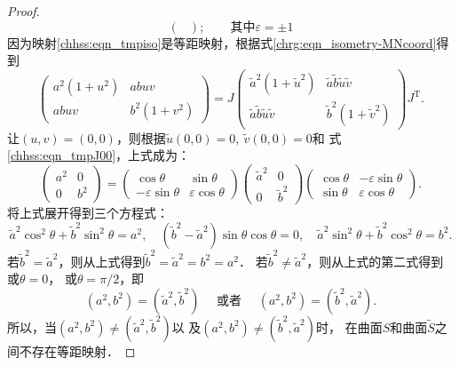 \begin{proof}
\begin{equation}
\begin{pmatrix}
    \end{pmatrix}; 
    \qquad \text{其中} \varepsilon= \pm 1
\end{equation}
因为映射\eqref{chhss:eqn_tmpiso}是等距映射，根据式\eqref{chrg:eqn_isometry-MNcoord}得到
\begin{equation}
    \begin{pmatrix}
        a^2\left(1+u^2\right) & a b u v \\
        a b u v & b^2\left(1+v^2\right)
    \end{pmatrix} = J \begin{pmatrix}
        \tilde{a}^2\left(1+\tilde{u}^2\right) & \tilde{a} \tilde{b} \tilde{u} \tilde{v} \\
        \tilde{a} \tilde{b} \tilde{u} \tilde{v} & \tilde{b}^2\left(1+\tilde{v}^2\right)
    \end{pmatrix} J^{\mathrm{T}} .
\end{equation}
让$(u, v)=(0,0)$，则根据$\tilde{u}(0,0)=0,\ \tilde{v}(0,0)=0 $和
式\eqref{chhss:eqn_tmpJ00}，上式成为：
\begin{equation}
    \begin{pmatrix}
        a^2 & 0 \\   0 & b^2
    \end{pmatrix}= \begin{pmatrix}
        \cos \theta & \sin \theta \\
        -\varepsilon \sin \theta & \varepsilon \cos \theta
    \end{pmatrix} \begin{pmatrix}
        \tilde{a}^2 & 0 \\ 0 & \tilde{b}^2
    \end{pmatrix} \begin{pmatrix}
        \cos \theta & -\varepsilon \sin \theta \\
        \sin \theta & \varepsilon \cos \theta
    \end{pmatrix} .
\end{equation}
将上式展开得到三个方程式：
\begin{equation*} %
    \tilde{a}^2 \cos ^2 \theta+\tilde{b}^2 \sin ^2 \theta =a^2, \quad
    \left(\tilde{b}^2-\tilde{a}^2\right) \sin \theta \cos \theta  =0, \quad
    \tilde{a}^2 \sin ^2 \theta+\tilde{b}^2 \cos ^2 \theta  =b^2 .
\end{equation*} %
若$\tilde{b}^2=\tilde{a}^2$，则从上式得到$\tilde{b}^2=\tilde{a}^2=b^2=a^2$．
若$\tilde{b}^2 \neq \tilde{a}^2$，则从上式的第二式得到或$\theta=0$，
或$\theta=\pi / 2$，即
\begin{equation}
    \left(a^2, b^2\right)=\left(\tilde{a}^2, \tilde{b}^2\right)
    \quad \text { 或者 } \quad 
    \left(a^2, b^2\right)=\left(\tilde{b}^2, \tilde{a}^2\right) .
\end{equation}
所以，当$(a^2, b^2) \neq (\tilde{a}^2, \tilde{b}^2 )$以
及$(a^2, b^2)\neq(\tilde{b}^2, \tilde{a}^2)$时，
在曲面$S$和曲面$\tilde{S}$之间不存在等距映射．
\end{proof}


